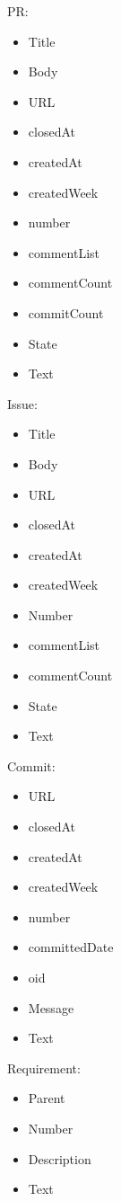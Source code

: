 \begin{multicols}{2}

PR:
\begin{itemize}
\item Title
\item Body
\item URL
\item closedAt
\item createdAt
\item createdWeek
\item number
\item commentList
\item commentCount
\item commitCount
\item State
\item Text
\end{itemize}

\columnbreak

Issue:
\begin{itemize}
\item Title
\item Body
\item URL
\item closedAt
\item createdAt
\item createdWeek
\item Number
\item commentList
\item commentCount
\item State
\item Text\\
\end{itemize}

\end{multicols}

\begin{multicols}{2}    

Commit:
\begin{itemize}
\item URL
\item closedAt
\item createdAt
\item createdWeek
\item number
\item committedDate
\item oid
\item Message
\item Text
\end{itemize}

\columnbreak

Requirement:
\begin{itemize}
\item Parent
\item Number
\item Description
\item Text
\end{itemize}



\end{multicols}

